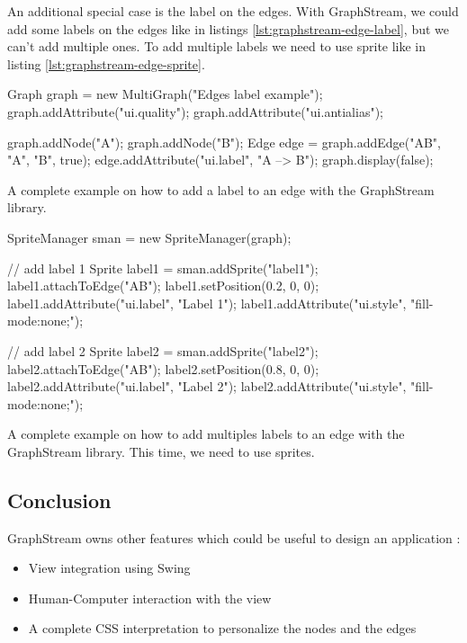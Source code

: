 An additional special case is the label on the edges. With GraphStream, we could
add some labels on the edges like in listings \ref{lst:graphstream-edge-label},
but we can't add multiple ones. To add multiple labels we need to use sprite like
in listing \ref{lst:graphstream-edge-sprite}.

\begin{listing}[H]
  \centering
  \begin{javacode}
  Graph graph = new MultiGraph("Edges label example");
  graph.addAttribute("ui.quality");
  graph.addAttribute("ui.antialias");
  
  graph.addNode("A");
  graph.addNode("B");
  Edge edge = graph.addEdge("AB", "A", "B", true);
  edge.addAttribute("ui.label", "A --> B");
  graph.display(false);
  \end{javacode}
  \caption[Add a label on an edge with GraphStream]{A complete example on how to
add a label to an edge with the GraphStream library.}
  \label{lst:graphstream-edge-label}
\end{listing}

\begin{listing}[H]
  \centering
  \begin{javacode}
    SpriteManager sman = new SpriteManager(graph);

    // add label 1
    Sprite label1 = sman.addSprite("label1");
    label1.attachToEdge("AB");
    label1.setPosition(0.2, 0, 0);
    label1.addAttribute("ui.label", "Label 1");
    label1.addAttribute("ui.style", "fill-mode:none;");

    // add label 2
    Sprite label2 = sman.addSprite("label2");
    label2.attachToEdge("AB");
    label2.setPosition(0.8, 0, 0);
    label2.addAttribute("ui.label", "Label 2");
    label2.addAttribute("ui.style", "fill-mode:none;");
  \end{javacode}
  \caption[Add two label on an edge with GraphStream]{A complete example on how
to add multiples labels to an edge with the GraphStream library. This time, we
need to use sprites.}
  \label{lst:graphstream-edge-sprite}
\end{listing}

\subsection{Conclusion}
\label{sub:Conclusion-gs}

GraphStream owns other features which could be useful to design an application :
\begin{itemize}
\item View integration using Swing
\item Human-Computer interaction with the view
\item A complete CSS interpretation to personalize the nodes and the edges
\end{itemize}

